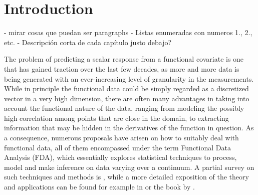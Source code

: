 %
%

\chapter{Introduction}\label{ch:introduction}


\begin{outcomment}
  - mirar cosas que puedan ser paragraphs
  - Listas enumeradas con numeros 1., 2., etc.
  - Descripción corta de cada capítulo justo debajo?
\end{outcomment}

The problem of predicting a scalar response from a functional covariate is one that has gained traction over the last few decades, as more and more data is being generated with an ever-increasing level of granularity in the measurements. While in principle the functional data could be simply regarded as a discretized vector in a very high dimension, there are often many advantages in taking into account the functional nature of the data, ranging from modeling the possibly high correlation among points that are close in the domain, to extracting information that may be hidden in the derivatives of the function in question. As a consequence, numerous proposals have arisen on how to suitably deal with functional data, all of them encompassed under the term Functional Data Analysis (FDA), which essentially explores statistical techniques to process, model and make inference on data varying over a continuum. A partial survey on such techniques and methods is \citet{cuevas2014partial}, while a more detailed exposition of the theory and applications can be found for example in \citet{hsing2015theoretical} or the book by \citet{horvath2012inference}.

